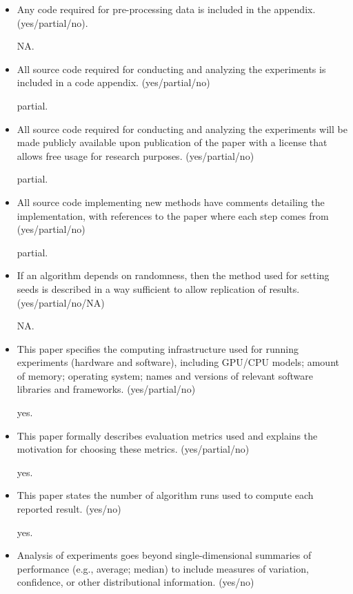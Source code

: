 \begin{itemize}
\item Any code required for pre-processing data is included in the appendix. (yes/partial/no).

NA.

\item All source code required for conducting and analyzing the experiments is included in a code appendix. (yes/partial/no)

partial.

\item All source code required for conducting and analyzing the experiments will be made publicly available upon publication of the paper with a license that allows free usage for research purposes. (yes/partial/no)

partial.

\item All source code implementing new methods have comments detailing the implementation, with references to the paper where each step comes from (yes/partial/no)

partial.

\item If an algorithm depends on randomness, then the method used for setting seeds is described in a way sufficient to allow replication of results. (yes/partial/no/NA)

NA.

\item This paper specifies the computing infrastructure used for running experiments (hardware and software), including GPU/CPU models; amount of memory; operating system; names and versions of relevant software libraries and frameworks. (yes/partial/no)

yes.

\item This paper formally describes evaluation metrics used and explains the motivation for choosing these metrics. (yes/partial/no)

yes.

\item This paper states the number of algorithm runs used to compute each reported result. (yes/no)

yes.

\item Analysis of experiments goes beyond single-dimensional summaries of performance (e.g., average; median) to include measures of variation, confidence, or other distributional information. (yes/no)


\end{itemize}
